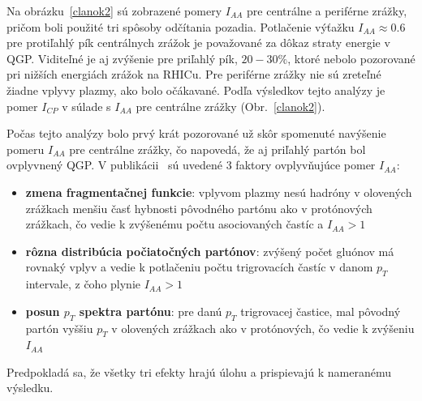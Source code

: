 \documentclass[thesismargins, thesislinespacing]{rnthesis}
\begin{document}
Na obrázku~\ref{clanok2} sú zobrazené pomery $I_{AA}$ pre centrálne a periférne zrážky, pričom boli použité tri spôsoby odčítania pozadia. Potlačenie výťažku $I_{AA}\approx0.6$ pre protiľahlý pík centrálnych zrážok je považované za dôkaz straty energie v QGP. Viditeľné je aj zvýšenie pre priľahlý pík, $20-30\%$, ktoré nebolo pozorované pri nižších energiách zrážok na RHICu. Pre periférne zrážky nie sú zreteľné žiadne vplyvy plazmy, ako bolo očákavané. Podľa výsledkov tejto analýzy je pomer $I_{CP}$ v súlade s $I_{AA}$ pre centrálne zrážky (Obr.~\ref{clanok2}).



Počas tejto analýzy bolo prvý krát pozorované už skôr spomenuté navýšenie pomeru $I_{AA}$ pre centrálne zrážky, čo napovedá, že aj priľahlý partón bol ovplyvnený QGP. V publikácii~\cite{clanok} sú uvedené 3 faktory ovplyvňujúce pomer $I_{AA}$:
\begin{itemize}
	\item \textbf{zmena fragmentačnej funkcie}: vplyvom plazmy nesú hadróny v olovených zrážkach menšiu časť hybnosti pôvodného partónu ako v protónových zrážkach, čo vedie k zvýšenému počtu asociovaných častíc a $I_{AA}>1$
	\item \textbf{rôzna distribúcia počiatočných partónov}: zvýšený počet gluónov má rovnaký vplyv a vedie k potlačeniu počtu trigrovacích častíc v danom $p_T$ intervale, z čoho plynie $I_{AA}>1$
	\item \textbf{posun $p_T$ spektra partónu}: pre danú $p_T$ trigrovacej častice, mal pôvodný partón vyššiu $p_T$ v olovených zrážkach ako v protónových, čo vedie k zvýšeniu $I_{AA}$
\end{itemize}

Predpokladá sa, že všetky tri efekty hrajú úlohu a prispievajú k nameranému výsledku.
\end{document}

